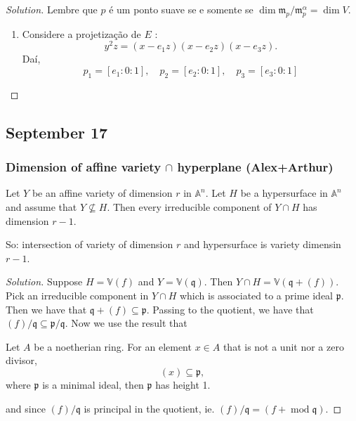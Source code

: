 \begin{proof}[Solution] Lembre que $p$ \'e um ponto suave se e somente se $\dim \mathfrak{m}_p/\mathfrak{m}_p^\alpha=\dim V$.
	\begin{enumerate}[label=\textbf{Step \arabic*}]
		\item Considere a projetiza\c c\~ao de $E$ :
			\[y^2z=(x-e_1z)(x-e_2z)(x-e_3z).\]
			Da\'i,
			\[p_1=[e_1:0:1],\quad p_2=[e_2:0:1],\quad p_3=[e_3:0:1]\]
			
	\end{enumerate}
\end{proof}

\subsection{September 17}
\subsubsection{Dimension of affine variety $\cap$ hyperplane (Alex+Arthur)}

\begin{manualexercise}{1.8}
	Let $Y$ be an affine variety of dimension $r$ in $\mathbb{A}^n$. Let $H$ be a hypersurface in $\mathbb{A}^n$ and assume that $ Y\not\subseteq H$. Then every irreducible component of $Y\cap H$ has dimension $r-1$.

	So: intersection of variety of dimension $r$ and hypersurface is variety dimensin $r-1$.
\end{manualexercise}

\begin{proof}[Solution]\leavevmode
	Suppose $H=\mathbb{V}(f)$ and $Y=\mathbb{V}(\mathfrak{q})$. Then $Y\cap H=\mathbb{V}(\mathfrak{q}+(f))$. Pick an irreducible component in $Y\cap H$ which is associated to a prime ideal $\mathfrak{p}$. Then we have that $\mathfrak{q}+(f)\subseteq \mathfrak{p}$. Passing to the quotient, we have that $(f)/\mathfrak{q}\subseteq \mathfrak{p}/\mathfrak{q}$. Now we use the result that

	\begin{thm}
		Let $A$ be a noetherian ring. For an element $x\in A$ that is not a unit nor a zero divisor,
		\[(x)\subseteq \mathfrak{p},\]
		where $\mathfrak{p}$ is a minimal ideal, then $\mathfrak{p}$ has height 1.
	\end{thm}
and since $(f)/\mathfrak{q}$ is principal in the quotient, ie. $(f)/\mathfrak{q}=(f+\operatorname{mod}\mathfrak{q})$.
\end{proof}


